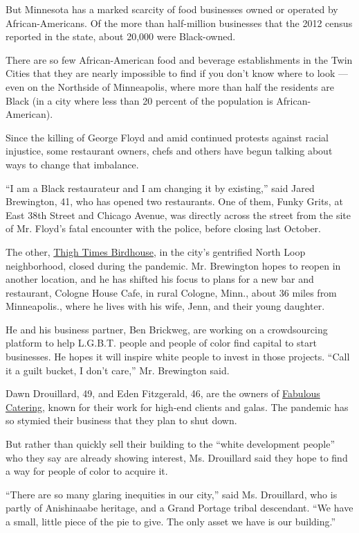 But Minnesota has a marked scarcity of food businesses owned or operated
by African-Americans. Of the more than half-million businesses that the
2012 census reported in the state, about 20,000 were Black-owned.

There are so few African-American food and beverage establishments in
the Twin Cities that they are nearly impossible to find if you don't
know where to look --- even on the Northside of Minneapolis, where more
than half the residents are Black (in a city where less than 20 percent
of the population is African-American).

Since the killing of George Floyd and amid continued protests against
racial injustice, some restaurant owners, chefs and others have begun
talking about ways to change that imbalance.

``I am a Black restaurateur and I am changing it by existing,'' said
Jared Brewington, 41, who has opened two restaurants. One of them, Funky
Grits, at East 38th Street and Chicago Avenue, was directly across the
street from the site of Mr. Floyd's fatal encounter with the police,
before closing last October.

The other, \href{https://www.thightimesbirdhouse.com/}{Thigh Times
Birdhouse}, in the city's gentrified North Loop neighborhood, closed
during the pandemic. Mr. Brewington hopes to reopen in another location,
and he has shifted his focus to plans for a new bar and restaurant,
Cologne House Cafe, in rural Cologne, Minn., about 36 miles from
Minneapolis., where he lives with his wife, Jenn, and their young
daughter.

He and his business partner, Ben Brickweg, are working on a
crowdsourcing platform to help L.G.B.T. people and people of color find
capital to start businesses. He hopes it will inspire white people to
invest in those projects. ``Call it a guilt bucket, I don't care,'' Mr.
Brewington said.

Dawn Drouillard, 49, and Eden Fitzgerald, 46, are the owners of
\href{http://www.fabulouscatering.com/}{Fabulous Catering}, known for
their work for high-end clients and galas. The pandemic has so stymied
their business that they plan to shut down.

But rather than quickly sell their building to the ``white development
people'' who they say are already showing interest, Ms. Drouillard said
they hope to find a way for people of color to acquire it.

``There are so many glaring inequities in our city,'' said Ms.
Drouillard, who is partly of Anishinaabe heritage, and a Grand Portage
tribal descendant. ``We have a small, little piece of the pie to give.
The only asset we have is our building.''

